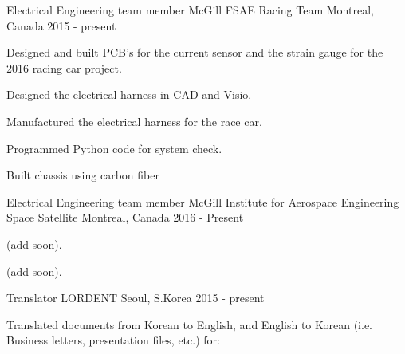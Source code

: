 \begin{cventries}
  \cventry
    {Electrical Engineering team member}
    {McGill FSAE Racing Team}
    {Montreal, Canada}
    {2015 - present}
    {
      \begin{cvitems}
        \item {Designed and built PCB’s for the current sensor and
        the strain gauge for the 2016 racing car project.}
        \item {Designed the electrical harness in CAD and Visio.}
        \item {Manufactured the electrical harness for the race car.}
        \item {Programmed Python code for system check.}
        \item {Built chassis using carbon fiber}
      \end{cvitems}
    }
  \cventry
    {Electrical Engineering team member}
    {McGill Institute for Aerospace Engineering Space Satellite}
    {Montreal, Canada}
    {2016 - Present}
    {
      \begin{cvitems}
        \item {(add soon).}
        \item {(add soon).}
      \end{cvitems}
    }
  \cventry
    {Translator}
    {LORDENT}
    {Seoul, S.Korea}
    {2015 - present}
    {
      \begin{cvitems}
        \item {Translated documents from Korean to English, and
        English to Korean (i.e. Business letters, presentation
        files, etc.) for:}
      \end{cvitems}
    }
\end{cventries}
